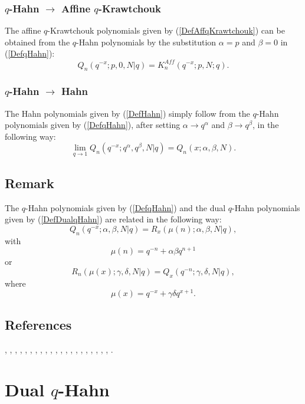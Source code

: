 \documentclass[envcountchap,graybox]{svmono}
\newcounter{rom}
\begin{document}
\subsubsection*{$q$-Hahn $\rightarrow$ Affine $q$-Krawtchouk}
The affine $q$-Krawtchouk polynomials given by (\ref{DefAffqKrawtchouk})
can be obtained from the $q$-Hahn polynomials by the substitution $\alpha=p$ and
$\beta=0$ in (\ref{DefqHahn}):
\begin{equation}
Q_n(q^{-x};p,0,N|q)=K_n^{Aff}(q^{-x};p,N;q).
\end{equation}

\subsubsection*{$q$-Hahn $\rightarrow$ Hahn}
The Hahn polynomials given by (\ref{DefHahn}) simply follow from the $q$-Hahn
polynomials given by (\ref{DefqHahn}), after setting $\alpha\rightarrow q^{\alpha}$
and $\beta\rightarrow q^{\beta}$, in the following way:
\begin{equation}
\lim_{q\rightarrow 1}Q_n(q^{-x};q^{\alpha},q^{\beta},N|q)=Q_n(x;\alpha,\beta,N).
\end{equation}

\subsection*{Remark}
The $q$-Hahn polynomials given by (\ref{DefqHahn}) and the dual $q$-Hahn
polynomials given by (\ref{DefDualqHahn}) are related in the following way:
$$Q_n(q^{-x};\alpha,\beta,N|q)=R_x(\mu(n);\alpha,\beta,N|q),$$
with
$$\mu(n)=q^{-n}+\alpha\beta q^{n+1}$$
or
$$R_n(\mu(x);\gamma,\delta,N|q)=Q_x(q^{-n};\gamma,\delta,N|q),$$
where
$$\mu(x)=q^{-x}+\gamma\delta q^{x+1}.$$

\subsection*{References}
\cite{AlSalam90}, \cite{AlvarezRonveaux}, \cite{AndrewsAskey85},
\cite{AskeyWilson79}, \cite{AskeyWilson85}, \cite{AtakRahmanSuslov},
\cite{Dunkl78II}, \cite{Fischer95}, \cite{GasperRahman84},
\cite{GasperRahman90}, \cite{Hahn}, \cite{KalninsMiller88},
\cite{Koelink96I}, \cite{KoelinkKoorn}, \cite{Koorn89III}, \cite{Koorn90II},
\cite{Nikiforov+}, \cite{NoumiMimachi90II}, \cite{Rahman82},
\cite{Stanton80II}, \cite{Stanton84}, \cite{Stanton90}.


\section{Dual $q$-Hahn}
\par\setcounter{equation}{0}
\end{document}
